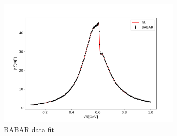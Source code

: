\documentclass[a4paper]{article}
\begin{document}
\begin{figure}[H]
    \centering
    \includegraphics[width=0.8\textwidth]{./plots/BABAR.png}
    \caption{BABAR data fit\label{fig4}}
\end{figure}
\end{document}
